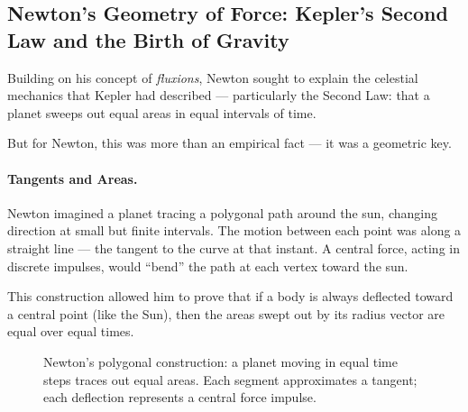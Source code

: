 \subsection{Newton’s Geometry of Force: Kepler’s Second Law and the Birth of Gravity}

Building on his concept of \textit{fluxions}, Newton sought to explain the celestial mechanics that Kepler had described — particularly the Second Law: that a planet sweeps out equal areas in equal intervals of time.

But for Newton, this was more than an empirical fact — it was a geometric key.

\paragraph{Tangents and Areas.} Newton imagined a planet tracing a polygonal path around the sun, changing direction at small but finite intervals. The motion between each point was along a straight line — the tangent to the curve at that instant. A central force, acting in discrete impulses, would “bend” the path at each vertex toward the sun.

This construction allowed him to prove that if a body is always deflected toward a central point (like the Sun), then the areas swept out by its radius vector are equal over equal times.

\begin{figure}[H]
\centering
{}
\caption{Newton’s polygonal construction: a planet moving in equal time steps traces out equal areas. Each segment approximates a tangent; each deflection represents a central force impulse.}
\end{figure}

